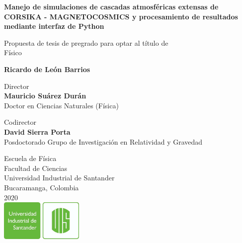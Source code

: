 \documentclass{report}
\begin{document}
\begin{titlepage}
   \begin{center}
       \vspace*{1cm}
       
       
       \Large
       \textbf{Manejo de simulaciones de cascadas atmosféricas extensas de CORSIKA - MAGNETOCOSMICS y procesamiento de resultados mediante interfaz de Python}
       
 
       \vspace{1.5cm}
 
       \normalsize
       Propuesta de tesis de pregrado para optar al título de \\
       Físico
       \vspace{1cm}
       
       
       \large
       \textbf{Ricardo de León Barrios}
       
       \vspace{1cm}
       Director\\
       \textbf{Mauricio Suárez Durán}\\
       Doctor en Ciencias Naturales (Física)
       
       \vspace{1cm}
       Codirector\\
       \textbf{David Sierra Porta}\\
       Posdoctorado Grupo de Investigación en Relatividad y Gravedad
 
       \vfill
       
       
 
       \vspace{0.8cm}
 
       
 
       \normalsize
       Escuela de Física\\
       Facultad de Ciencias\\
       Universidad Industrial de Santander\\
       Bucaramanga, Colombia\\
       2020\\
       \vspace{0.3cm}
       \includegraphics[width=0.3\textwidth]{logo/logoUIS.png}
 
   \end{center}
\end{titlepage}
\end{document}
